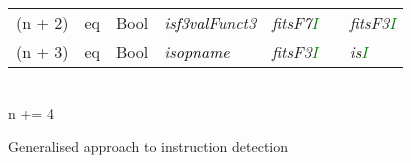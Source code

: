 \begin{algorithm}
{\begin{tabular}[h]{>{\ttfamily\color{UniRed}}r >{\ttfamily}l >{\ttfamily\color{UniGrey}}l >{\slshape\color{UniRed}}l >{\slshape\color{UniRed}}l >{\slshape\color{UniRed}}l >{\slshape} l}
            (n + 2) & eq     & Bool & is\textcolor{Black}{f3val}Funct3 & fitsF7\textcolor{Green}{I} &  & fitsF3\textcolor{Green}{I} \\
            (n + 3) & eq     & Bool & is\textcolor{Black}{opname}      & fitsF3\textcolor{Green}{I} &  & is\textcolor{Green}{I}     \\
            \hline
            \hline
        \end{tabular}\\
        \textcolor{UniRed}{n} += 4\\
    }
    \caption[Instruction detection]{Generalised approach to instruction detection}\label{alg:commanddetection}
\end{algorithm}